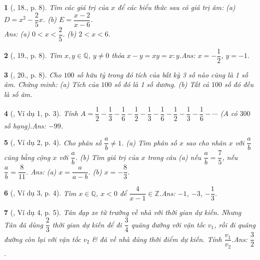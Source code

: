 \documentclass{article}
\newtheorem{baitoan}{}
\begin{document}
\begin{baitoan}[\cite{Tuyen_Toan_7}, 18., p. 8]
	Tìm các giá trị của $x$ để các biểu thức sau có giá trị âm: (a) $D = x^2 - \dfrac{2}{5}x$. (b) $E = \dfrac{x - 2}{x - 6}$.\\\mbox{}\hfill{\sf Ans: (a) $0 < x < \dfrac{2}{5}$. (b) $2 < x < 6$.}
\end{baitoan}

\begin{baitoan}[\cite{Tuyen_Toan_7}, 19., p. 8]
	Tìm $x,y\in\mathbb{Q}$, $y\ne 0$ thỏa $x - y = xy = x:y$.\hfill{\sf Ans: $x = -\dfrac{1}{2}$, $y = -1$.}
\end{baitoan}

\begin{baitoan}[\cite{Tuyen_Toan_7}, 20., p. 8]
	Cho $100$ số hữu tỷ trong đó tích của bất kỳ 3 số nào cũng là 1 số âm. Chứng minh: (a) Tích của $100$ số đó là 1 số dương. (b) Tất cả $100$ số đó đều là số âm.	
\end{baitoan}

\begin{baitoan}[\cite{Binh_Toan_7_tap_1}, Ví dụ 1, p. 3]
	Tính $A = \dfrac{1}{2} - \dfrac{1}{3} - \dfrac{1}{6} - \dfrac{1}{2} - \dfrac{1}{3} - \dfrac{1}{6} - \dfrac{1}{2} - \dfrac{1}{3} - \dfrac{1}{6} - \cdots$ ($A$ có $300$ số hạng).\hfill{\sf Ans: $-99$.}
\end{baitoan}

\begin{baitoan}[\cite{Binh_Toan_7_tap_1}, Ví dụ 2, p. 4]
	Cho phân số $\dfrac{a}{b}\ne 1$.	(a) Tìm phân số $x$ sao cho nhân $x$ với $\dfrac{a}{b}$ cũng bằng cộng $x$ với $\dfrac{a}{b}$. (b) Tìm giá trị của $x$ trong câu (a) nếu $\dfrac{a}{b} = \dfrac{7}{5}$, nếu $\dfrac{a}{b} = \dfrac{8}{11}$. \hfill{\sf Ans: (a) $x = \dfrac{a}{a - b}$. (b) $x = -\dfrac{8}{3}$.}
\end{baitoan}

\begin{baitoan}[\cite{Binh_Toan_7_tap_1}, Ví dụ 3, p. 4]
	Tìm $x\in\mathbb{Q}$, $x < 0$ để $\dfrac{4}{x - 1}\in\mathbb{Z}$.\hfill{\sf Ans: $-1$, $-3$, $-\dfrac{1}{3}$.}
\end{baitoan}

\begin{baitoan}[\cite{Binh_Toan_7_tap_1}, Ví dụ 4, p. 5]
	Tân đạp xe từ trường về nhà với thời gian dự kiến. Nhưng Tân đã dùng $\dfrac{2}{3}$ thời gian dự kiến để đi $\dfrac{3}{4}$ quãng đường với vận tốc $v_1$, rồi đi quãng đường còn lại với vận tốc $v_2$ \& đã về nhà đúng thời điểm dự kiến. Tính $\dfrac{v_1}{v_2}$.\hfill{\sf Ans: $\dfrac{3}{2}$.}
\end{baitoan}
\end{document}
